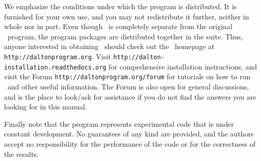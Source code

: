 \vspace{0.5 cm}

We emphasize the conditions under which the
program is distributed.  It is furnished for your own use,
and you may not redistribute it further, neither in whole nor in
part.  Even though \lsdalton\ is completely separate from the original
\dalton\ program, the program packages are distributed together in the
{\latestrelease} suite. Thus, 
anyone interested in obtaining \lsdalton\ should check out the
\dalton\ homepage at
\verb|http://daltonprogram.org|. Visit \verb|http://dalton-installation.readthedocs.org|
for comprehensive installation instructions, and visit the Forum
\verb|http://daltonprogram.org/forum| for 
tutorials on how to run \lsdalton\ and other 
useful information. The Forum is also open for general discussions, and 
is the place to look/ask for assistance if you do not find the answers 
you are looking for in this manual.

Finally note that the
program represents experimental code that is
under constant development.  No guarantees of any kind are
provided, and the authors accept no responsibility for the
performance of the code or for the correctness of the results.

